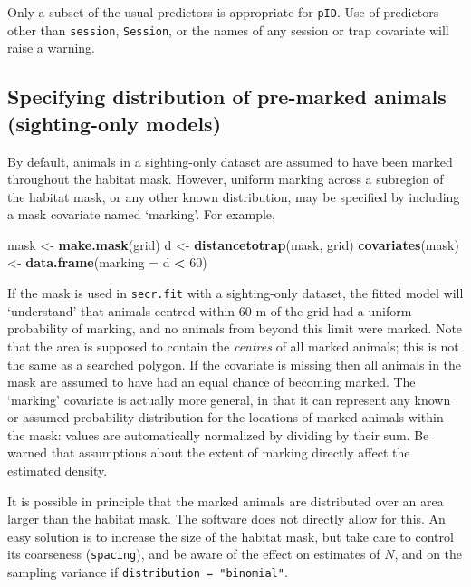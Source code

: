 \documentclass[
]{book}
\newenvironment{Shaded}{\begin{snugshade}}{\end{snugshade}}
\newcommand{\AttributeTok}[1]{\textcolor[rgb]{0.13,0.29,0.53}{#1}}
\newcommand{\DecValTok}[1]{\textcolor[rgb]{0.00,0.00,0.81}{#1}}
\newcommand{\FunctionTok}[1]{\textcolor[rgb]{0.13,0.29,0.53}{\textbf{#1}}}
\newcommand{\NormalTok}[1]{#1}
\newcommand{\OtherTok}[1]{\textcolor[rgb]{0.56,0.35,0.01}{#1}}
\newcommand{\SpecialCharTok}[1]{\textcolor[rgb]{0.81,0.36,0.00}{\textbf{#1}}}
\begin{document}
Only a subset of the usual predictors is appropriate for \texttt{pID}. Use of predictors other than \texttt{session}, \texttt{Session}, or the names of any session or trap covariate will raise a warning.

\subsection{Specifying distribution of pre-marked animals (sighting-only models)}\label{areaspecification}

By default, animals in a sighting-only dataset are assumed to have been marked throughout the habitat mask. However, uniform marking across a subregion of the habitat mask, or any other known distribution, may be specified by including a mask covariate named `marking'. For example,

\begin{Shaded}
\begin{Highlighting}[]
\NormalTok{mask }\OtherTok{\textless{}{-}} \FunctionTok{make.mask}\NormalTok{(grid)}
\NormalTok{d }\OtherTok{\textless{}{-}} \FunctionTok{distancetotrap}\NormalTok{(mask, grid)}
\FunctionTok{covariates}\NormalTok{(mask) }\OtherTok{\textless{}{-}} \FunctionTok{data.frame}\NormalTok{(}\AttributeTok{marking =}\NormalTok{ d }\SpecialCharTok{\textless{}} \DecValTok{60}\NormalTok{)}
\end{Highlighting}
\end{Shaded}

If the mask is used in \texttt{secr.fit} with a sighting-only dataset, the fitted model will `understand' that animals centred within 60 m of the grid had a uniform probability of marking, and no animals from beyond this limit were marked. Note that the area is supposed to contain the \emph{centres} of all marked animals; this is not the same as a searched polygon. If the covariate is missing then all animals in the mask are assumed to have had an equal chance of becoming marked. The `marking' covariate is actually more general, in that it can represent any known or assumed probability distribution for the locations of marked animals within the mask: values are automatically normalized by dividing by their sum. Be warned that assumptions about the extent of marking directly affect the estimated density.

It is possible in principle that the marked animals are distributed over an area larger than the habitat mask. The software does not directly allow for this. An easy solution is to increase the size of the habitat mask, but take care to control its coarseness (\texttt{spacing}), and be aware of the effect on estimates of \(N\), and on the sampling variance if \texttt{distribution\ =\ "binomial"}.
\end{document}
